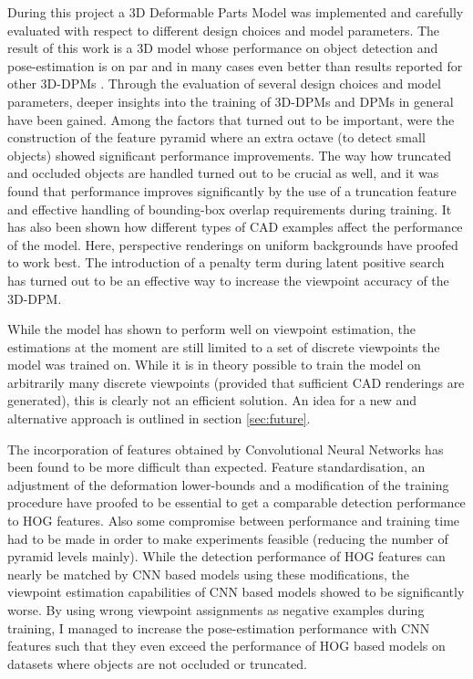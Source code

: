 During this project a 3D Deformable Parts Model was implemented and carefully evaluated with respect to different design choices and model parameters. The result of this work is a 3D model whose performance on object detection and pose-estimation is on par and in many cases even better than results reported for other 3D-DPMs \cite{Pepik:2012aa} \cite{6248075}. Through the evaluation of several design choices and model parameters, deeper insights into the training of 3D-DPMs and DPMs in general have  been gained. Among the factors that turned out to be important, were the construction of the feature pyramid where an extra octave (to detect small objects) showed significant performance improvements. The way how truncated and occluded objects are handled turned out to be crucial as well, and it was found that performance improves significantly by the use of a truncation feature and effective handling of bounding-box overlap requirements during training. It has also been shown how different types of CAD examples affect the performance of the model. Here, perspective renderings on uniform backgrounds have proofed to work best. The introduction of a penalty term during latent positive search has turned out to be an effective way to increase the viewpoint accuracy of the 3D-DPM.

While the model has shown to perform well on viewpoint estimation, the estimations at the moment are still limited to a set of discrete viewpoints the model was trained on. While it is in theory possible to train the model on arbitrarily many discrete viewpoints (provided that sufficient CAD renderings are generated), this is clearly not an efficient solution. An idea for a new and alternative approach is outlined in section \ref{sec:future}.

The incorporation of features obtained by Convolutional Neural Networks has been found to be more difficult than expected. Feature standardisation, an adjustment of the deformation lower-bounds and a modification of the training procedure have proofed to be essential to get a comparable detection performance to HOG features. Also some compromise between performance and training time had to be made in order to make experiments feasible (reducing the number of pyramid levels mainly). While the detection performance of HOG features can nearly be matched by CNN based models using these modifications, the viewpoint estimation capabilities of CNN based models showed to be significantly worse. By using wrong viewpoint assignments as negative examples during training, I managed to increase the pose-estimation performance with CNN features such that they even exceed the performance of HOG based models on datasets where objects are not occluded or truncated. 

